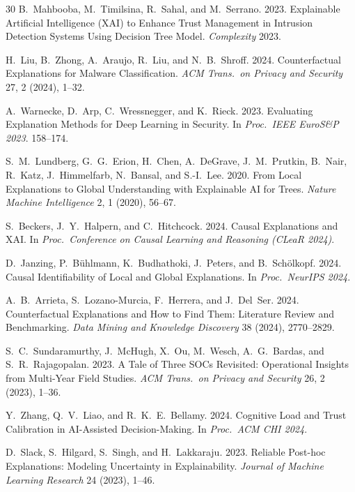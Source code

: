 \documentclass[sigconf,nonacm]{acmart}
\begin{document}
\begin{thebibliography}{30}
B.~Mahbooba, M.~Timilsina, R.~Sahal, and M.~Serrano. 2023. Explainable
Artificial Intelligence (XAI) to Enhance Trust Management in Intrusion
Detection Systems Using Decision Tree Model. \textit{Complexity} 2023.

H.~Liu, B.~Zhong, A.~Araujo, R.~Liu, and N.~B.~Shroff. 2024. Counterfactual
Explanations for Malware Classification. \textit{ACM Trans.\ on
Privacy and Security} 27, 2 (2024), 1--32.

A.~Warnecke, D.~Arp, C.~Wressnegger, and K.~Rieck. 2023. Evaluating
Explanation Methods for Deep Learning in Security. In
\textit{Proc.\ IEEE EuroS\&P 2023}. 158--174.

S.~M.~Lundberg, G.~G.~Erion, H.~Chen, A.~DeGrave, J.~M.~Prutkin, B.~Nair,
R.~Katz, J.~Himmelfarb, N.~Bansal, and S.-I.~Lee. 2020. From Local
Explanations to Global Understanding with Explainable AI for Trees.
\textit{Nature Machine Intelligence} 2, 1 (2020), 56--67.

S.~Beckers, J.~Y.~Halpern, and C.~Hitchcock. 2024. Causal Explanations and
XAI. In \textit{Proc.\ Conference on Causal Learning and Reasoning (CLeaR
2024)}.

D.~Janzing, P.~B\"uhlmann, K.~Budhathoki, J.~Peters, and B.~Sch\"olkopf.
2024. Causal Identifiability of Local and Global Explanations. In
\textit{Proc.\ NeurIPS 2024}.

A.~B.~Arrieta, S.~Lozano-Murcia, F.~Herrera, and J.~Del~Ser. 2024.
Counterfactual Explanations and How to Find Them: Literature Review and
Benchmarking. \textit{Data Mining and Knowledge Discovery} 38 (2024),
2770--2829.

S.~C.~Sundaramurthy, J.~McHugh, X.~Ou, M.~Wesch, A.~G.~Bardas, and
S.~R.~Rajagopalan. 2023. A Tale of Three SOCs Revisited: Operational
Insights from Multi-Year Field Studies. \textit{ACM Trans.\ on Privacy
and Security} 26, 2 (2023), 1--36.

Y.~Zhang, Q.~V.~Liao, and R.~K.~E.~Bellamy. 2024. Cognitive Load and Trust
Calibration in AI-Assisted Decision-Making. In \textit{Proc.\ ACM CHI 2024}.

D.~Slack, S.~Hilgard, S.~Singh, and H.~Lakkaraju. 2023. Reliable Post-hoc
Explanations: Modeling Uncertainty in Explainability. \textit{Journal of
Machine Learning Research} 24 (2023), 1--46.


\end{thebibliography}
\end{document}

